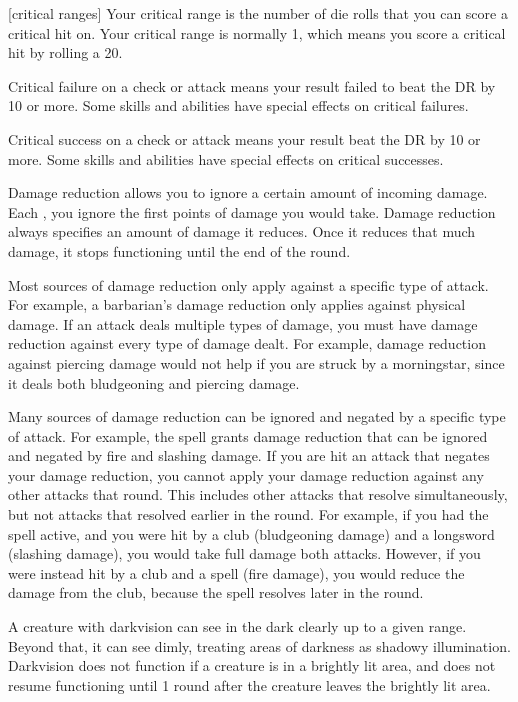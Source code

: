 [critical ranges] Your critical range is the number of die rolls that you can score a critical hit on.
Your critical range is normally 1, which means you score a critical hit by rolling a 20.

 Critical failure on a check or attack means your result failed to beat the DR by 10 or more.
Some skills and abilities have special effects on critical failures.

 Critical success on a check or attack means your result beat the DR by 10 or more.
Some skills and abilities have special effects on critical successes.

 Damage reduction allows you to ignore a certain amount of incoming damage.
Each , you ignore the first points of damage you would take.
Damage reduction always specifies an amount of damage it reduces.
Once it reduces that much damage, it stops functioning until the end of the round.

Most sources of damage reduction only apply against a specific type of attack.
For example, a barbarian's damage reduction only applies against physical damage.
If an attack deals multiple types of damage, you must have damage reduction against every type of damage dealt.
For example, damage reduction against piercing damage would not help if you are struck by a morningstar, since it deals both bludgeoning and piercing damage.

Many sources of damage reduction can be ignored and negated by a specific type of attack.
For example, the  spell grants damage reduction that can be ignored and negated by fire and slashing damage.
If you are hit an attack that negates your damage reduction, you cannot apply your damage reduction against any other attacks that round.
This includes other attacks that resolve simultaneously, but not attacks that resolved earlier in the round.
For example, if you had the  spell active, and you were hit by a club (bludgeoning damage) and a longsword (slashing damage), you would take full damage both attacks.
However, if you were instead hit by a club and a  spell (fire damage), you would reduce the damage from the club, because the spell resolves later in the round.

 A creature with darkvision can see in the dark clearly up to a given range.
Beyond that, it can see dimly, treating areas of darkness as shadowy illumination.
Darkvision does not function if a creature is in a brightly lit area, and does not resume functioning until 1 round after the creature leaves the brightly lit area.

